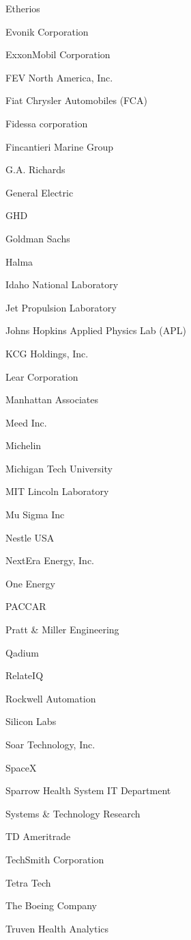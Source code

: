 \documentclass[twoside]{article}
\begin{document}
\begin{center}
\begin{multicols}{5}
\begin{FlushLeft}
\begin{compactitem}
\item Etherios
\item Evonik Corporation
\item ExxonMobil Corporation
\item FEV North America, Inc.
\item Fiat Chrysler Automobiles (FCA)
\item Fidessa corporation
\item Fincantieri Marine Group
\item G.A. Richards
\item General Electric
\item GHD
\item Goldman Sachs
\item Halma
\item Idaho National Laboratory
\item Jet Propulsion Laboratory
\item Johns Hopkins Applied Physics Lab (APL)
\item KCG Holdings, Inc.
\item Lear Corporation
\item Manhattan Associates
\item Meed Inc.
\item Michelin
\item Michigan Tech University
\item MIT Lincoln Laboratory
\item Mu Sigma Inc
\item Nestle USA
\item NextEra Energy, Inc.
\item One Energy
\item PACCAR
\item Pratt \& Miller Engineering
\item Qadium
\item RelateIQ
\item Rockwell Automation
\item Silicon Labs
\item Soar Technology, Inc.
\item SpaceX
\item Sparrow Health System IT Department
\item Systems \& Technology Research
\item TD Ameritrade
\item TechSmith Corporation
\item Tetra Tech
\item The Boeing Company
\item Truven Health Analytics

\end{compactitem}
\end{FlushLeft}
\end{multicols}
\end{center}
\end{document}
